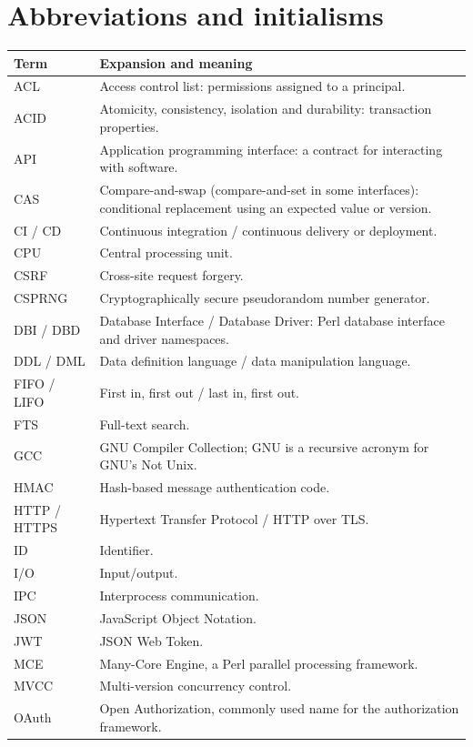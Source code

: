 \documentclass[11pt,openany]{book}
\begin{document}
\section*{Abbreviations and initialisms}
\begin{longtable}{L{.20\linewidth}L{.72\linewidth}}
\toprule Term & Expansion and meaning\\\midrule\endhead
ACL & Access control list: permissions assigned to a principal.\\
ACID & Atomicity, consistency, isolation and durability: transaction properties.\\
API & Application programming interface: a contract for interacting with software.\\
CAS & Compare-and-swap (compare-and-set in some interfaces): conditional replacement using an expected value or version.\\
CI / CD & Continuous integration / continuous delivery or deployment.\\
CPU & Central processing unit.\\
CSRF & Cross-site request forgery.\\
CSPRNG & Cryptographically secure pseudorandom number generator.\\
DBI / DBD & Database Interface / Database Driver: Perl database interface and driver namespaces.\\
DDL / DML & Data definition language / data manipulation language.\\
FIFO / LIFO & First in, first out / last in, first out.\\
FTS & Full-text search.\\
GCC & GNU Compiler Collection; GNU is a recursive acronym for GNU's Not Unix.\\
HMAC & Hash-based message authentication code.\\
HTTP / HTTPS & Hypertext Transfer Protocol / HTTP over TLS.\\
ID & Identifier.\\
I/O & Input/output.\\
IPC & Interprocess communication.\\
JSON & JavaScript Object Notation.\\
JWT & JSON Web Token.\\
MCE & Many-Core Engine, a Perl parallel processing framework.\\
MVCC & Multi-version concurrency control.\\
OAuth & Open Authorization, commonly used name for the authorization framework.\\

\end{longtable}
\end{document}

